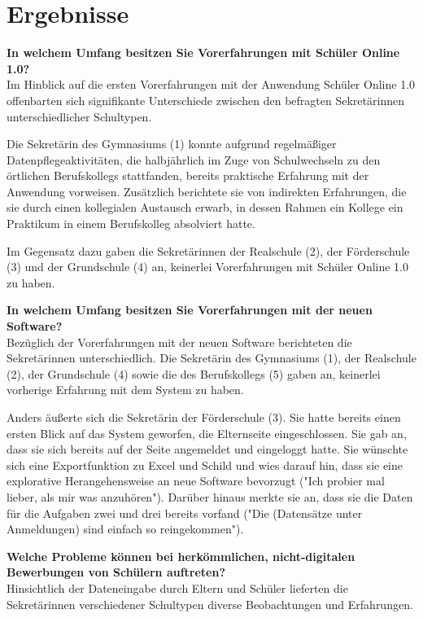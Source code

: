 \pagebreak
\section{Ergebnisse}

\textbf{In welchem Umfang besitzen Sie Vorerfahrungen mit Schüler Online 1.0?}\\
Im Hinblick auf die ersten Vorerfahrungen mit der Anwendung Schüler Online 1.0 offenbarten sich signifikante Unterschiede zwischen den befragten Sekretärinnen unterschiedlicher Schultypen.

Die Sekretärin des Gymnasiums (1) konnte aufgrund regelmäßiger Datenpflegeaktivitäten, die halbjährlich im Zuge von Schulwechseln zu den örtlichen Berufskollegs stattfanden, bereits praktische Erfahrung mit der Anwendung vorweisen. Zusätzlich berichtete sie von indirekten Erfahrungen, die sie durch einen kollegialen Austausch erwarb, in dessen Rahmen ein Kollege ein Praktikum in einem Berufskolleg absolviert hatte.

Im Gegensatz dazu gaben die Sekretärinnen der Realschule (2), der Förderschule (3) und der Grundschule (4) an, keinerlei Vorerfahrungen mit Schüler Online 1.0 zu haben.


\textbf{In welchem Umfang besitzen Sie Vorerfahrungen mit der neuen Software?}\\
Bezüglich der Vorerfahrungen mit der neuen Software berichteten die Sekretärinnen unterschiedlich. Die Sekretärin des Gymnasiums (1), der Realschule (2), der Grundschule (4) sowie die des Berufskollegs (5) gaben an, keinerlei vorherige Erfahrung mit dem System zu haben.

Anders äußerte sich die Sekretärin der Förderschule (3). Sie hatte bereits einen ersten Blick auf das System geworfen, die Elternseite eingeschlossen. Sie gab an, dass sie sich bereits auf der Seite angemeldet und eingeloggt hatte. Sie wünschte sich eine Exportfunktion zu Excel und Schild und wies darauf hin, dass sie eine explorative Herangehensweise an neue Software bevorzugt ("Ich probier mal lieber, als mir was anzuhören"). Darüber hinaus merkte sie an, dass sie die Daten für die Aufgaben zwei und drei bereits vorfand ("Die (Datensätze unter Anmeldungen) sind einfach so reingekommen").

\textbf{Welche Probleme können bei herkömmlichen, nicht-digitalen Bewerbungen von Schülern auftreten?}\\
Hinsichtlich der Dateneingabe durch Eltern und Schüler lieferten die Sekretärinnen verschiedener Schultypen diverse Beobachtungen und Erfahrungen.

